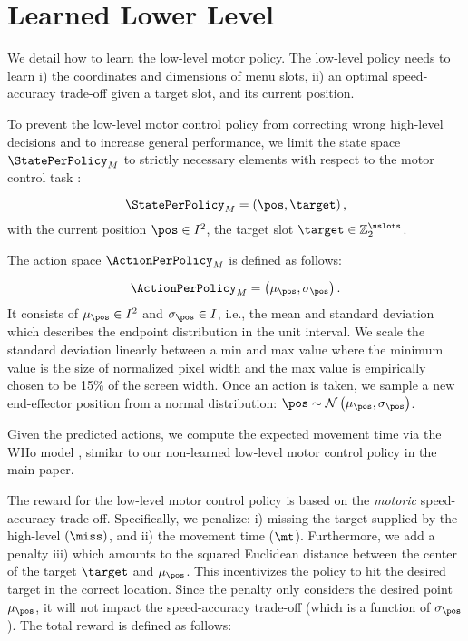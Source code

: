 \section{Learned Lower Level}
\label{app:learned}
We detail how to learn the low-level motor policy. The low-level policy needs to learn i) the coordinates and dimensions of menu slots, ii) an optimal speed-accuracy trade-off given a target slot, and its current position. 

To prevent the low-level motor control policy from correcting wrong high-level decisions and to increase general performance, we limit the state space $\StatePerPolicy_M$ to strictly necessary elements with respect to the motor control task \cite{christen2021hide}: 

\begin{equation}
    \StatePerPolicy_M = \left (\pos, \target \right ),
\end{equation}
with the current position $\pos \in I^2$, the target slot $\target \in \mathbb{Z}_2^{\nslots}$. 

The action space $\ActionPerPolicy_M$ is defined as follows:

\begin{equation}
    \ActionPerPolicy_M = \left(\mu_{\pos}, \sigma_{\pos} \right).
\end{equation}
It consists of $\mu_{\pos} \in I^2$ and $\sigma_{\pos} \in I$, i.e., the mean and standard deviation which describes the endpoint distribution in the unit interval. We scale the standard deviation linearly between a min and max value where the minimum value is the size of normalized pixel width and the max value is empirically chosen to be 15\% of the screen width. Once an action is taken, we sample a new end-effector position from a normal distribution: $\pos \sim \mathcal{N}\left(\mu_{\pos}, \sigma_{\pos}\right)$.

Given the predicted actions, we compute the expected movement time via the WHo model \cite{guiard2015mathematical}, similar to our non-learned low-level motor control policy in the main paper. 

The reward for the low-level motor control policy is based on the \emph{motoric} speed-accuracy trade-off. Specifically, we penalize: i) missing the target supplied by the high-level $(\miss)$, and ii) the movement time ($\mt$). Furthermore,  we add a penalty iii)  which amounts to the squared Euclidean distance between the center of the target $\target$ and $\mu_\pos$. This incentivizes the policy to hit the desired target in the correct location. Since the penalty only considers the desired point $\mu_\pos$, it will not impact the speed-accuracy trade-off (which is a function of $\sigma_\pos$). The total reward is defined as follows:

